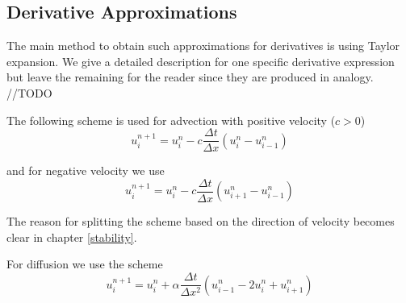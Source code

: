 \documentclass[]{article}
\begin{document}
\subsection{Derivative Approximations}
The main method to obtain such approximations for derivatives is using Taylor expansion.
We give a detailed description for one specific derivative expression but leave the remaining for the reader since they are produced in analogy.\\


//TODO

The following scheme is used for advection with positive velocity ($c>0$)
\begin{equation} \label{advection_scheme_upwind}
u_{i}^{n+1}=u_{i}^{n}-c\frac{\Delta t}{\Delta x} (u_{i}^{n}-u_{i-1}^{n})
\end{equation}

and for negative velocity we use
\begin{equation} \label{advection_scheme_downwind}
u_{i}^{n+1}=u_{i}^{n}-c\frac{\Delta t}{\Delta x} (u_{i+1}^{n}-u_{i-1}^{n})
\end{equation}

The reason for splitting the scheme based on the direction of velocity becomes clear in chapter \ref{stability}.

For diffusion we use the scheme
\begin{equation} \label{diffusion_scheme}
u_{i}^{n+1}=u_{i}^ {n}+\alpha\frac{\Delta t}{\Delta x^{2}} (u_{i-1}^{n}-2u_{i}^{n}+u_{i+1}^{n})
\end{equation}
\end{document}
